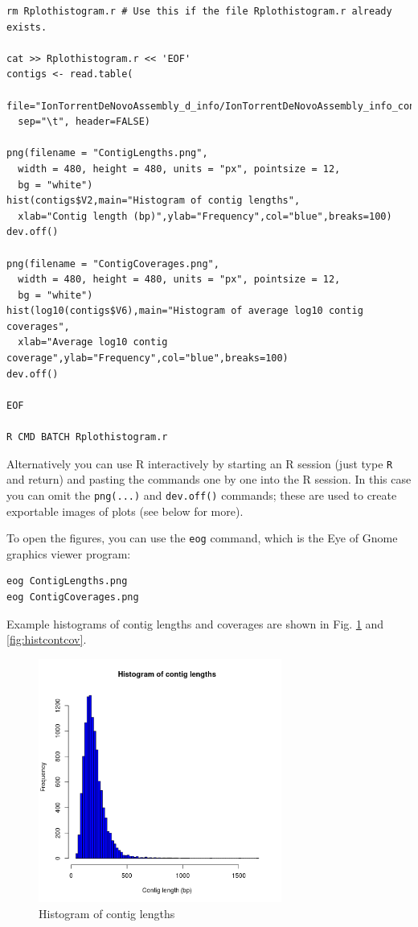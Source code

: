 \documentclass[11pt]{article}
\begin{document}
\begin{verbatim}
rm Rplothistogram.r # Use this if the file Rplothistogram.r already exists.

cat >> Rplothistogram.r << 'EOF'
contigs <- read.table(
  file="IonTorrentDeNovoAssembly_d_info/IonTorrentDeNovoAssembly_info_contigstats.txt", 
  sep="\t", header=FALSE)

png(filename = "ContigLengths.png",
  width = 480, height = 480, units = "px", pointsize = 12,
  bg = "white")
hist(contigs$V2,main="Histogram of contig lengths",
  xlab="Contig length (bp)",ylab="Frequency",col="blue",breaks=100)
dev.off()

png(filename = "ContigCoverages.png",
  width = 480, height = 480, units = "px", pointsize = 12,
  bg = "white")
hist(log10(contigs$V6),main="Histogram of average log10 contig coverages",
  xlab="Average log10 contig coverage",ylab="Frequency",col="blue",breaks=100)
dev.off()

EOF

R CMD BATCH Rplothistogram.r
\end{verbatim}

Alternatively you can use R interactively by starting an R session
(just type \texttt{R} and return) and pasting the commands one by one into the
R session. In this case you can omit the \texttt{png(...)} and \texttt{dev.off()} commands;
these are used to create exportable images of plots (see below for more).

To open the figures, you can use the \texttt{eog} command, which is the
Eye of Gnome graphics viewer program:

\begin{verbatim}
eog ContigLengths.png
eog ContigCoverages.png
\end{verbatim}


Example histograms of contig lengths and coverages are shown in
Fig. \ref{fig:histcontlength} and \ref{fig:histcontcov}.

\clearpage

\begin{figure}[htb]
\centering
\includegraphics[width=8cm]{ContigLengths.png}
\caption{\label{fig:histcontlength}Histogram of contig lengths}
\end{figure}
\end{document}
